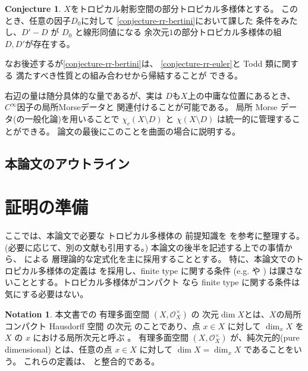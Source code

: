 \documentclass[a4paper,dvipdfmx,reqno,12pt]{amsart}
\theoremstyle{definition}
\newtheorem{conjecture}[theorem]{Conjecture}
\newtheorem{notation}[theorem]{Notation}
\numberwithin{equation}{section}
\begin{document}
\begin{conjecture}
$X$をトロピカル射影空間の部分トロピカル多様体とする。
このとき、任意の因子$D_0$に対して
\cref{conjecture-rr-bertini}において課した
条件をみたし、$D'-D$ が $D_0$ と線形同値になる
余次元$1$の部分トロピカル多様体の組
$D,D'$が存在する。
\end{conjecture}



なお後述するが\cref{conjecture-rr-bertini}は、
\cref{conjecture-rr-euler}と Todd 類に関する
満たすべき性質との組み合わせから帰結することが
できる。

右辺の量は随分具体的な量であるが、実は
$D$も$X$上の中庸な位置にあるとき、
$C^{\infty}$因子の局所Morseデータと
関連付けることが可能である。
局所 Morse データ(の一般化論)を用いることで
$\chi_c(X\setminus D)$ と
$\chi (X\setminus D)$
は統一的に管理することができる。
論文の最後にこのことを曲面の場合に説明する。

\subsection{本論文のアウトライン}



\section{証明の準備}

ここでは、本論文で必要な
トロピカル多様体の
前提知識を
\cite{mikhalkin2018tropical,MR4637248,demedrano2023chern}
を参考に整理する。
(必要に応じて、別の文献も引用する。)
本論文の後半を記述する上での事情から、
\cite{MR4637248}による
層理論的な定式化を主に採用することとする。
特に、本論文でのトロピカル多様体の定義は
\cite[Definition 6.1]{gross2019sheaftheoretic}
を採用し、finite type に関する条件
(e.g. \cite[Definition 7.1.14]{mikhalkin2018tropical} や
\cite[Definition 2.3 (4)]{demedrano2023chern})
は課さないこととする。トロピカル多様体がコンパクト
なら finite type に関する条件は気にする必要はない。

\begin{notation}
本文書での
有理多面空間 $(X,\mathcal{O}_X^{\times})$ 
\cite[Definition 2.2]{MR4246795} の
次元$\dim X$とは、$X$の局所コンパクト Hausdorff 空間
の次元\cite[Chapter III. Definition 9.4]{MR842190}
のことであり、点 $x\in X$ に対して
$\dim_x X$ を $X$ の $x$ における局所次元と呼ぶ
\cite[Chapter III. Definition 9.10]{MR842190}。
有理多面空間
$(X,\mathcal{O}_X^{\times})$
が、純次元的(pure dimensional)
とは、任意の点 $x\in X$ に対して
$\dim X=\dim_x X$ であることをいう。
これらの定義は、
\cite[Definition 7.1.1]{mikhalkin2018tropical}
と整合的である。
\end{notation}
\end{document}
